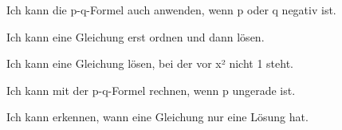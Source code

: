 \documentclass[11pt]{article}
\begin{document}
\begin{kbaufgabe}{Ich kann die p-q-Formel auch anwenden, wenn p oder q negativ ist.}
\begin{kbblock}
\end{kbblock}
\end{kbaufgabe}

\begin{kbaufgabe}{Ich kann eine Gleichung erst ordnen und dann lösen.}
\begin{kbblock}
\end{kbblock}
\end{kbaufgabe}

\begin{kbaufgabe}{Ich kann eine Gleichung lösen, bei der vor x² nicht 1 steht.}
\begin{kbblock}
\end{kbblock}
\end{kbaufgabe}

\begin{kbaufgabe}{Ich kann mit der p-q-Formel rechnen, wenn p ungerade ist.}
\begin{kbblock}
\end{kbblock}
\end{kbaufgabe}

\begin{kbaufgabe}{Ich kann erkennen, wann eine Gleichung nur eine Lösung hat.}
\begin{kbblock}
\end{kbblock}
\end{kbaufgabe}
\end{document}

